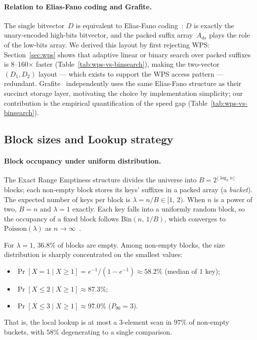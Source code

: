 \paragraph{Relation to Elias-Fano coding and Grafite.}
The single bitvector~$D$ is equivalent to Elias-Fano
coding~\citep{elias1974efficient,fano1971number}: $D$ is exactly the unary-encoded
high-bits bitvector, and the packed suffix array~$A_{ds}$ plays the role of the
low-bits array.
We derived this layout by first rejecting WPS: Section~\ref{sec:wps} shows that adaptive linear or binary
search over packed suffixes is 8--160$\times$ faster (Table~\ref{tab:wps-vs-binsearch}),
making the two-vector $(D_1, D_2)$ layout --- which exists to support the WPS access
pattern --- redundant.
Grafite~\citep{grafite2024} independently uses the same Elias-Fano structure as their
succinct storage layer, motivating the choice by implementation simplicity; our
contribution is the empirical quantification of the speed gap
(Table~\ref{tab:wps-vs-binsearch}).

\subsection{Block sizes and Lookup strategy}
\label{subsec:block-sizes-and-lookup-strategy}

\paragraph{Block occupancy under uniform distribution.}
The Exact Range Emptiness structure divides the universe into $B = 2^{\lfloor \log_2 n \rfloor}$ blocks;
each non-empty block stores its keys' suffixes in a packed array (a \emph{bucket}).
The expected
number of keys per block is $\lambda = n/B \in [1,\,2)$.
When $n$ is a power of two, $B = n$ and $\lambda = 1$ exactly.
Each key falls into a uniformly random block, so the occupancy of a fixed block
follows $\mathrm{Bin}(n,\,1/B)$, which converges to $\mathrm{Poisson}(\lambda)$
as $n \to \infty$~\citep[Ch.~5]{mitzenmacher2017probability}.

For $\lambda = 1$, $36.8\%$ of blocks are empty. Among non-empty blocks,
the size distribution is sharply concentrated on the smallest values:
\begin{itemize}
    \item $\Pr[X = 1 \mid X \geq 1] = e^{-1}/(1 - e^{-1}) \approx 58.2\%$
        (median of $1$ key);
    \item $\Pr[X \leq 2 \mid X \geq 1] \approx 87.3\%$;
    \item $\Pr[X \leq 3 \mid X \geq 1] \approx 97.0\%$ ($P_{90} = 3$).
\end{itemize}
That is, the local lookup is at most a $3$-element scan in $97\%$ of
non-empty buckets, with $58\%$ degenerating to a single comparison.

